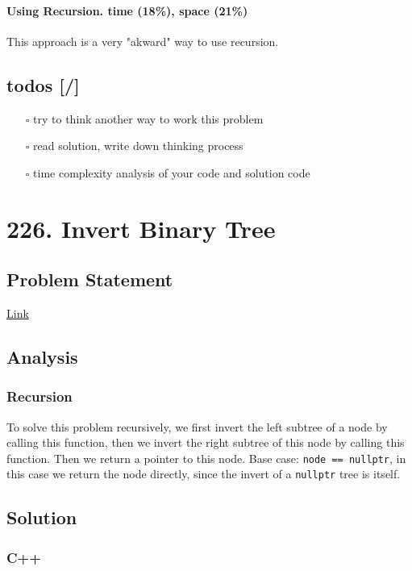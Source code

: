 \documentclass[12pt]{article}
\begin{document}
\paragraph{Using Recursion. time (18\%), space (21\%)}
\label{sec:org34226a3}
This approach is a very "akward" way to use recursion.
\subsection{todos [/]}
\label{sec:org75cb206}
\begin{itemize}
\item[{$\square$}] try to think another way to work this problem
\item[{$\square$}] read solution, write down thinking process
\item[{$\square$}] time complexity analysis of your code and solution code
\end{itemize}
\section{226. Invert Binary Tree}
\label{sec:org5dffbbf}
\subsection{Problem Statement}
\label{sec:orge2adc03}
\href{https://leetcode.com/problems/invert-binary-tree/}{Link}
\subsection{Analysis}
\label{sec:org617b577}
\subsubsection{Recursion}
\label{sec:orga51b53b}
To solve this problem recursively, we first invert the left subtree of a node by calling this function, then we invert the right subtree of this node by calling this function. Then we return a pointer to this node. Base case: \texttt{node == nullptr}, in this case we return the node directly, since the invert of a \texttt{nullptr} tree is itself.
\subsection{Solution}
\label{sec:orgeae46a5}
\subsubsection{C++}
\label{sec:orge5f9abf}
\end{document}
